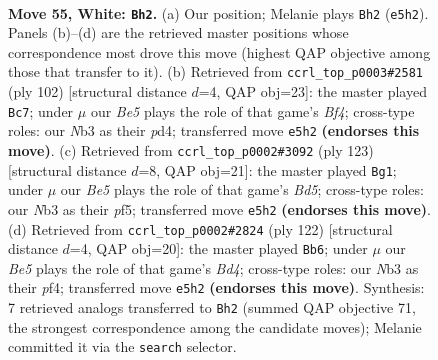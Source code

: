 \documentclass[11pt]{article}
\begin{document}
\clearpage

\begin{figure}[p]\centering
\begin{subfigure}{0.46\textwidth}\centering
\resizebox{\linewidth}{!}{%
\newchessgame
\chessboard[
  setfen={6k1/2P5/2r5/4B3/8/1N3K2/8/8 w - - 23 55},
  showmover=false,
  pgfstyle=straightmove, color=movearrow, markmove={e5-h2}
]}
\caption{}
\end{subfigure}\hfill
\begin{subfigure}{0.46\textwidth}\centering
\resizebox{\linewidth}{!}{%
\newchessgame
\chessboard[
  setfen={8/7k/8/8/3p1B2/8/6rP/4K3 w - - 2 52},
  showmover=false,
  pgfstyle=straightmove, color=movearrow, markmove={f4-c7}
]}
\caption{}
\end{subfigure}
\\[4pt]
\begin{subfigure}{0.46\textwidth}\centering
\resizebox{\linewidth}{!}{%
\newchessgame
\chessboard[
  setfen={8/5k2/2R5/2p2P2/3b4/8/3K4/8 b - - 6 62},
  showmover=false,
  pgfstyle=straightmove, color=movearrow, markmove={d4-g1}
]}
\caption{}
\end{subfigure}\hfill
\begin{subfigure}{0.46\textwidth}\centering
\resizebox{\linewidth}{!}{%
\newchessgame
\chessboard[
  setfen={r7/P7/4k3/8/3B1p2/8/8/5K2 w - - 9 62},
  showmover=false,
  pgfstyle=straightmove, color=movearrow, markmove={d4-b6}
]}
\caption{}
\end{subfigure}
\caption{\textbf{Move 55, White: \texttt{Bh2}.} (a) Our position; Melanie plays \texttt{Bh2} (\texttt{e5h2}). Panels (b)--(d) are the retrieved master positions whose correspondence most drove this move (highest QAP objective among those that transfer to it). (b) Retrieved from \texttt{ccrl\_top\_p0003\#2581} (ply 102) [structural distance $d$=4, QAP obj=23]: the master played \texttt{Bc7}; under $\mu$ our \emph{Be5} plays the role of that game's \emph{Bf4}; cross-type roles: our \emph{N}b3 as their \emph{p}d4; transferred move \texttt{e5h2} \textbf{(endorses this move)}. (c) Retrieved from \texttt{ccrl\_top\_p0002\#3092} (ply 123) [structural distance $d$=8, QAP obj=21]: the master played \texttt{Bg1}; under $\mu$ our \emph{Be5} plays the role of that game's \emph{Bd5}; cross-type roles: our \emph{N}b3 as their \emph{p}f5; transferred move \texttt{e5h2} \textbf{(endorses this move)}. (d) Retrieved from \texttt{ccrl\_top\_p0002\#2824} (ply 122) [structural distance $d$=4, QAP obj=20]: the master played \texttt{Bb6}; under $\mu$ our \emph{Be5} plays the role of that game's \emph{Bd4}; cross-type roles: our \emph{N}b3 as their \emph{p}f4; transferred move \texttt{e5h2} \textbf{(endorses this move)}. Synthesis: 7 retrieved analogs transferred to \texttt{Bh2} (summed QAP objective 71, the strongest correspondence among the candidate moves); Melanie committed it via the \texttt{search} selector.}
\label{fig:thought-m108}
\end{figure}
\end{document}
